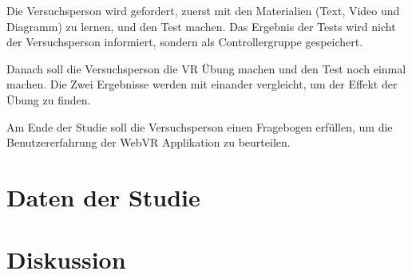 Die Versuchsperson wird gefordert, zuerst mit den Materialien (Text, Video und Diagramm) zu lernen, und den Test machen. Das Ergebnis der Tests wird nicht der Versuchsperson informiert, sondern als Controllergruppe gespeichert.

Danach soll die Versuchsperson die VR Übung machen und den Test noch einmal machen. Die Zwei Ergebnisse werden mit einander vergleicht, um der Effekt der Übung zu finden.

Am Ende der Studie soll die Versuchsperson einen Fragebogen erfüllen, um die Benutzererfahrung der WebVR Applikation zu beurteilen.

\section{Daten der Studie}

\section{Diskussion}










